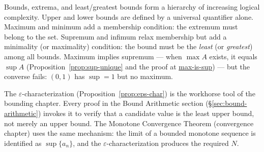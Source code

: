 \begin{remark*}
Bounds, extrema, and least/greatest bounds form a hierarchy of increasing
logical complexity.
Upper and lower bounds are defined by a universal quantifier alone.
Maximum and minimum add a membership condition: the extremum must belong
to the set.
Supremum and infimum relax membership but add a minimality (or maximality)
condition: the bound must be the \emph{least} (or \emph{greatest}) among
all bounds.
Maximum implies supremum — when $\max A$ exists, it equals $\sup A$
(Proposition~\ref{prop:sup-unique} and the proof at
\hyperref[prf:max-is-sup]{max-is-sup}) — but the converse fails:
$(0,1)$ has $\sup = 1$ but no maximum.
\end{remark*}

\begin{remark*}
The $\varepsilon$-characterization (Proposition~\ref{prop:eps-char}) is the
workhorse tool of the bounding chapter.
Every proof in the Bound Arithmetic section
(\S\ref{sec:bound-arithmetic}) invokes it to verify that a candidate value
is the least upper bound, not merely an upper bound.
The Monotone Convergence Theorem (convergence chapter) uses the same
mechanism: the limit of a bounded monotone sequence is identified as
$\sup\{a_n\}$, and the $\varepsilon$-characterization produces the required
$N$.
\end{remark*}
